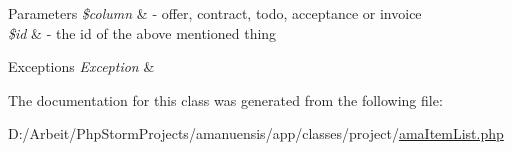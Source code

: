 \begin{DoxyParams}{Parameters}
{\em \$column} & -\/ offer, contract, todo, acceptance or invoice \\
\hline
{\em \$id} & -\/ the id of the above mentioned thing \\
\hline
\end{DoxyParams}

\begin{DoxyExceptions}{Exceptions}
{\em Exception} & \\
\hline
\end{DoxyExceptions}


The documentation for this class was generated from the following file\+:\begin{DoxyCompactItemize}
\item 
D\+:/\+Arbeit/\+Php\+Storm\+Projects/amanuensis/app/classes/project/\hyperlink{ama_item_list_8php}{ama\+Item\+List.\+php}\end{DoxyCompactItemize}
